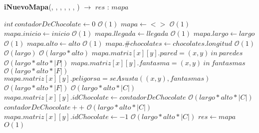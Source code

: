 \documentclass{book}
\newcommand{\bigO}{\mathcal{O}}
\begin{document}
\begin{Algoritmos}


\medskip
	
  	\medskip

    \begin{algorithm}[H]{\textbf{iNuevoMapa}({, , , , , , }) $\to$ $res$ : $mapa$}
        \begin{algorithmic}[1]
        	\State $int\ contadorDeChocolate \gets 0$                               \Comment $\bigO(1)$
            \State $mapa \gets <>$                               \Comment $\bigO(1)$
            \State $mapa.inicio  \gets inicio$                           \Comment $\bigO(1)$
            \State $mapa.llegada \gets llegada$           \Comment $\bigO(1)$
            \State $mapa.largo \gets largo$                               \Comment $\bigO(1)$
            \State $mapa.alto  \gets alto$                           \Comment $\bigO(1)$
            \State $mapa.\#chocolates \gets chocolates.longitud$           \Comment $\bigO(1)$
                                \Comment $\bigO(largo)$
                                    \Comment $\bigO(largo*alto)$
                \State $mapa.matriz[x][y].pared = (x,y) \ in \ paredes$                                        \Comment $\bigO(largo*alto*|P|)$
                 \State $mapa.matriz[x][y].fantasma = (x,y) \ in \ fantasmas$                                        \Comment $\bigO(largo*alto*|F|)$
                 \State $mapa.matriz[x][y].peligorsa = seAsusta((x,y),fantasmas)$                                        \Comment $\bigO(largo*alto*|F|)$
                                                                        \Comment $\bigO(largo*alto*|C|	)$
                 \State $mapa.matriz[x][y].idChocolate \gets contadorDeChocolate$                    \Comment $\bigO(largo*alto*|C|)$
                 \State $contadorDeChocolate++ $                                     \Comment $\bigO(largo*alto*|C|)$
                 \Else
                 \State $mapa.matriz[x][y].idChocolate \gets -1$                                      \Comment $\bigO(largo*alto*|C|)$
                 \EndIf
                \EndFor
            \EndFor                                            
            \State $res \gets mapa$                              \Comment $O(1)$


\end{algorithmic}
\end{algorithm}
\end{Algoritmos}
\end{document}
